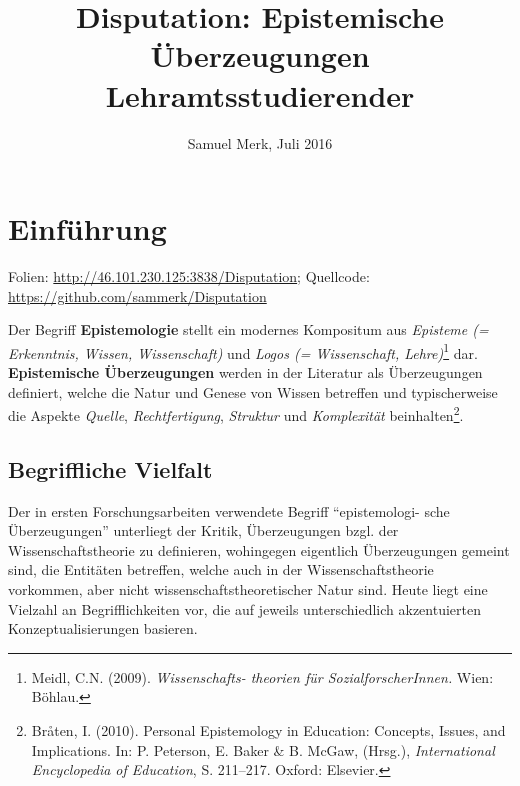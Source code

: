 \documentclass[]{tufte-handout}
\title{Disputation: Epistemische Überzeugungen \mbox{Lehramtsstudierender}}
\date{Samuel Merk, Juli 2016}
\begin{document}
\maketitle




\section{Einführung}\label{einfuhrung}

\begin{marginfigure}
Folien: \url{http://46.101.230.125:3838/Disputation}; Quellcode:
\url{https://github.com/sammerk/Disputation}
\end{marginfigure}

Der Begriff \textbf{Epistemologie} stellt ein modernes Kompositum aus
\emph{Episteme (= Erkenntnis, Wissen, Wissenschaft)} und \emph{Logos (=
Wissenschaft, Lehre)}\footnote{Meidl, C.N. (2009).
  \emph{Wissenschafts- theorien für SozialforscherInnen.} Wien: Böhlau.}
dar. \textbf{Epistemische Überzeugungen} werden in der Literatur als
Überzeugungen definiert, welche die Natur und Genese von Wissen
betreffen und typischerweise die Aspekte \emph{Quelle},
\emph{Rechtfertigung}, \emph{Struktur} und \emph{Komplexität}
beinhalten\footnote{Bråten, I. (2010). Personal Epistemology in
  Education: Concepts, Issues, and Implications. In: P. Peterson, E.
  Baker \& B. McGaw, (Hrsg.), \emph{International Encyclopedia of
  Education}, S. 211--217. Oxford: Elsevier.}.

\subsection{Begriffliche Vielfalt}\label{begriffliche-vielfalt}

Der in ersten Forschungsarbeiten verwendete Begriff ``epistemologi- sche
Überzeugungen'' unterliegt der Kritik, Überzeugungen bzgl. der
Wissenschaftstheorie zu definieren, wohingegen eigentlich Überzeugungen
gemeint sind, die Entitäten betreffen, welche auch in der
Wissenschaftstheorie vorkommen, aber nicht wissenschaftstheoretischer
Natur sind. Heute liegt eine Vielzahl an Begrifflichkeiten vor, die
auf jeweils unterschiedlich akzentuierten Konzeptualisierungen basieren.
\end{document}
